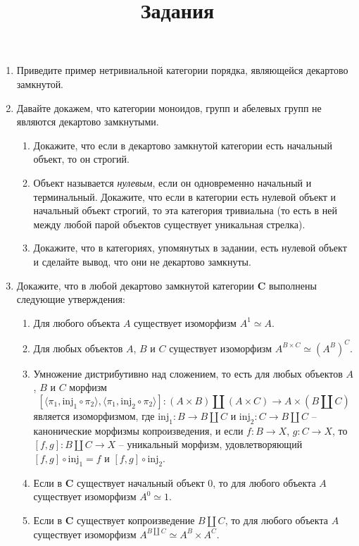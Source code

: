 \documentclass[draft]{article}
\newcommand{\cat}[1]{\mathbf{#1}}
\renewcommand{\C}{\cat{C}}
\newcommand{\inj}{\mathrm{inj}}
\begin{document}
\title{Задания}
\maketitle

\begin{enumerate}

\item Приведите пример нетривиальной категории порядка, являющейся декартово замкнутой.

\item Давайте докажем, что категории моноидов, групп и абелевых групп не являются декартово замкнутыми.
\begin{enumerate}
\item Докажите, что если в декартово замкнутой категории есть начальный объект, то он строгий.
\item Объект называется \emph{нулевым}, если он одновременно начальный и терминальный.
Докажите, что если в категории есть нулевой объект и начальный объект строгий, то эта категория тривиальна (то есть в ней между любой парой объектов существует уникальная стрелка).
\item Докажите, что в категориях, упомянутых в задании, есть нулевой объект и сделайте вывод, что они не декартово замкнуты.
\end{enumerate}

\item Докажите, что в любой декартово замкнутой категории $\C$ выполнены следующие утверждения:
\begin{enumerate}
\item Для любого объекта $A$ существует изоморфизм $A^1 \simeq A$.
\item Для любых объектов $A$, $B$ и $C$ существует изоморфизм $A^{B \times C} \simeq (A^B)^C$.
\item Умножение дистрибутивно над сложением, то есть для любых объектов $A$, $B$ и $C$ морфизм
\[ [\langle \pi_1, \inj_1 \circ \pi_2 \rangle, \langle \pi_1, \inj_2 \circ \pi_2 \rangle ] : (A \times B) \amalg (A \times C) \to A \times (B \amalg C) \]
является изоморфизмом, где $\inj_1 : B \to B \amalg C$ и $\inj_2 : C \to B \amalg C$ -- канонические морфизмы копроизведения, и
если $f : B \to X$, $g : C \to X$, то $[f,g] : B \amalg C \to X$ -- уникальный морфизм, удовлетворяющий $[f,g] \circ \inj_1 = f$ и $[f,g] \circ \inj_2$.
\item Если в $\C$ существует начальный объект 0, то для любого объекта $A$ существует изоморфизм $A^0 \simeq 1$.
\item Если в $\C$ существует копроизведение $B \amalg C$, то для любого объекта $A$ существует изоморфизм $A^{B \amalg C} \simeq A^B \times A^C$.
\end{enumerate}


\end{enumerate}
\end{document}

